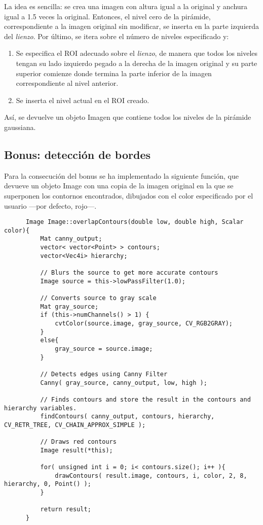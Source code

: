 \documentclass[a4paper, 11pt]{article}
\theoremstyle{definition}
\theoremstyle{theorem}
\begin{document}
  La idea es sencilla: se crea una imagen con altura igual a la original y anchura igual a 1.5 veces la original. Entonces, el nivel cero de la pirámide, correspondiente a la imagen original sin modificar, se inserta en la parte izquierda del \emph{lienzo}. Por último, se itera sobre el número de niveles especificado y:
  \begin{enumerate}
      \item Se especifica el ROI adecuado sobre el \emph{lienzo}, de manera que todos los niveles tengan su lado izquierdo pegado a la derecha de la imagen original y su parte superior comienze donde termina la parte inferior de la imagen correspondiente al nivel anterior.
      \item Se inserta el nivel actual en el ROI creado.
  \end{enumerate}

  Así, se devuelve un objeto Imagen que contiene todos los niveles de la pirámide gaussiana.

  \subsection{Bonus: detección de bordes}
  Para la consecución del bonus se ha implementado la siguiente función, que devueve un objeto Image con una copia de la imagen original en la que se superponen los contornos encontrados, dibujados con el color especificado por el usuario ---por defecto, rojo---.

  \begin{lstlisting}
      Image Image::overlapContours(double low, double high, Scalar color){
          Mat canny_output;
          vector< vector<Point> > contours;
          vector<Vec4i> hierarchy;

          // Blurs the source to get more accurate contours
          Image source = this->lowPassFilter(1.0);

          // Converts source to gray scale
          Mat gray_source;
          if (this->numChannels() > 1) {
              cvtColor(source.image, gray_source, CV_RGB2GRAY);
          }
          else{
              gray_source = source.image;
          }

          // Detects edges using Canny Filter
          Canny( gray_source, canny_output, low, high );

          // Finds contours and store the result in the contours and hierarchy variables.
          findContours( canny_output, contours, hierarchy, CV_RETR_TREE, CV_CHAIN_APPROX_SIMPLE );

          // Draws red contours
          Image result(*this);

          for( unsigned int i = 0; i< contours.size(); i++ ){
              drawContours( result.image, contours, i, color, 2, 8, hierarchy, 0, Point() );
          }

          return result;
      }
  \end{lstlisting}
\end{document}
